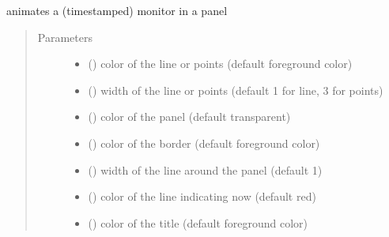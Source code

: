 \documentclass[letterpaper,10pt,english]{sphinxmanual}
\begin{document}
\begin{fulllineitems}
\label{\detokenize{Reference:salabim.AnimateMonitor}}
animates a (timestamped) monitor in a panel
\begin{quote}\begin{description}
\item[{Parameters}] \leavevmode\begin{itemize}
\item {} 
 () \textendash{} color of the line or points (default foreground color)

\item {} 
 () \textendash{} width of the line or points (default 1 for line, 3 for points)

\item {} 
 () \textendash{} color of the panel (default transparent)

\item {} 
 () \textendash{} color of the border (default foreground color)

\item {} 
 () \textendash{} width of the line around the panel (default 1)

\item {} 
 () \textendash{} color of the line indicating now (default red)

\item {} 
 () \textendash{} color of the title (default foreground color)


\end{itemize}
\end{description}
\end{quote}
\end{fulllineitems}
\end{document}
